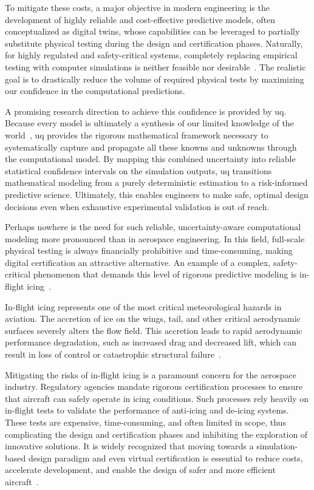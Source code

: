 \smallskip
To mitigate these costs, a major objective in modern engineering is the development of highly reliable and cost-effective predictive models, often conceptualized as digital twins, whose capabilities can be leveraged to partially substitute physical testing during the design and certification phases. Naturally, for highly regulated and safety-critical systems, completely replacing empirical testing with computer simulations is neither feasible nor desirable~\cite{oden2010predictive}. The realistic goal is to drastically reduce the volume of required physical tests by maximizing our confidence in the computational predictions.

\smallskip
A promising research direction to achieve this confidence is provided by \gls{uq}. Because every model is ultimately a synthesis of our limited knowledge of the world~\cite{uq_theory}, \gls{uq} provides the rigorous mathematical framework necessary to systematically capture and propagate all these knowns and unknowns through the computational model. By mapping this combined uncertainty into reliable statistical confidence intervals on the simulation outputs, \gls{uq} transitions mathematical modeling from a purely deterministic estimation to a risk-informed predictive science. Ultimately, this enables engineers to make safe, optimal design decisions even when exhaustive experimental validation is out of reach.

\smallskip
Perhaps nowhere is the need for such reliable, uncertainty-aware computational modeling more pronounced than in aerospace engineering. In this field, full-scale physical testing is always financially prohibitive and time-consuming, making digital certification an attractive alternative. An example of a complex, safety-critical phenomenon that demands this level of rigorous predictive modeling is in-flight icing~\cite{Bellosta2021}.

\smallskip
In-flight icing represents one of the most critical meteorological hazards in aviation. The accretion of ice on the wings, tail, and other critical aerodynamic surfaces severely alters the flow field. This accretion leads to rapid aerodynamic performance degradation, such as increased drag and decreased lift, which can result in loss of control or catastrophic structural failure~\cite{bragg1986, Morelli2022, EASAIcing}.

\smallskip
Mitigating the risks of in-flight icing is a paramount concern for the aerospace industry. Regulatory agencies mandate rigorous certification processes to ensure that aircraft can safely operate in icing conditions. Such processes rely heavily on in-flight tests to validate the performance of anti-icing and de-icing systems. These tests are expensive, time-consuming, and often limited in scope, thus complicating the design and certification phases and inhibiting the exploration of innovative solutions. It is widely recognized that moving towards a simulation-based design paradigm and even virtual certification is essential to reduce costs, accelerate development, and enable the design of safer and more efficient aircraft~\cite{jacobi2019collection, Gori2022}.

